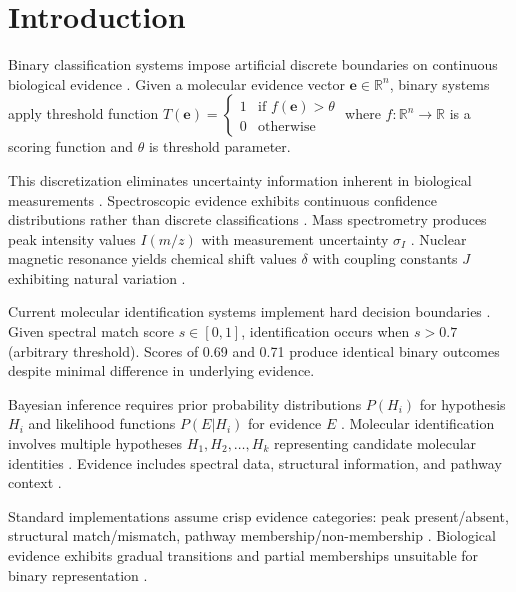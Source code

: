 
\section{Introduction}

Binary classification systems impose artificial discrete boundaries on continuous biological evidence \cite{fawcett2006introduction}. Given a molecular evidence vector $\mathbf{e} \in \mathbb{R}^n$, binary systems apply threshold function $T(\mathbf{e}) = \begin{cases} 1 & \text{if } f(\mathbf{e}) > \theta \\ 0 & \text{otherwise} \end{cases}$ where $f: \mathbb{R}^n \rightarrow \mathbb{R}$ is a scoring function and $\theta$ is threshold parameter.

This discretization eliminates uncertainty information inherent in biological measurements \cite{kidd2014uncertainty}. Spectroscopic evidence exhibits continuous confidence distributions rather than discrete classifications \cite{stein2014mass}. Mass spectrometry produces peak intensity values $I(m/z)$ with measurement uncertainty $\sigma_I$ \cite{hoffmann2007mass}. Nuclear magnetic resonance yields chemical shift values $\delta$ with coupling constants $J$ exhibiting natural variation \cite{claridge2016high}.

Current molecular identification systems implement hard decision boundaries \cite{kind2007fiehnlib, horai2010massbank}. Given spectral match score $s \in [0,1]$, identification occurs when $s > 0.7$ (arbitrary threshold). Scores of 0.69 and 0.71 produce identical binary outcomes despite minimal difference in underlying evidence.

Bayesian inference requires prior probability distributions $P(H_i)$ for hypothesis $H_i$ and likelihood functions $P(E|H_i)$ for evidence $E$ \cite{gelman2013bayesian}. Molecular identification involves multiple hypotheses $H_1, H_2, \ldots, H_k$ representing candidate molecular identities \cite{wolfender2019accelerating}. Evidence includes spectral data, structural information, and pathway context \cite{dunn2013mass}.

Standard implementations assume crisp evidence categories: peak present/absent, structural match/mismatch, pathway membership/non-membership \cite{rogers2019application}. Biological evidence exhibits gradual transitions and partial memberships unsuitable for binary representation \cite{zadeh1965fuzzy}.

